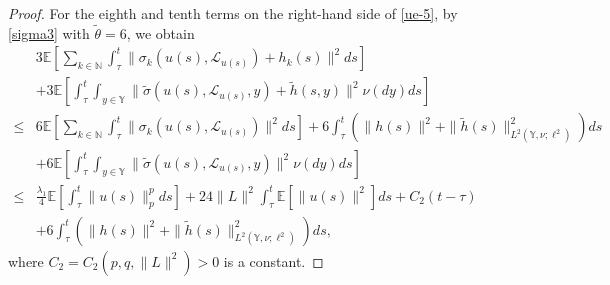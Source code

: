 \documentclass[11pt]{article}
\numberwithin{equation}{section}
\theoremstyle{plain}
\begin{document}
\begin{proof}
 For the eighth and tenth terms on the right-hand side of \eqref{ue-5},
 by \eqref{sigma3} with $\tilde{\theta}=6$, we obtain
 \begin{align}\label{ue-6}
       & 3 \mathbb{E}
                   \left[ \sum_{k \in \mathbb{N} } \int_{\tau}^{t}
                             \| \sigma_k(u(s), \mathcal{L}_{u(s)}) + h_k(s)\|^2 ds
                   \right]  \nonumber \\
       & + 3 \mathbb{E}
                 \left[  
                           \int_{\tau}^{t} \int_{
                           y\in \mathbb{Y}
                           }
                                 \|\widetilde{\sigma}(u(s), \mathcal{L}_{u(s)},y) + \widetilde{h}(s,y)\|^2
                           \nu(dy) ds
                 \right]  \nonumber \\
 \le & 6 \mathbb{E}
               \left[ \sum_{k \in \mathbb{N} } \int_{\tau}^{t} \|\sigma_k(u(s), \mathcal{L}_{u(s)}) \|^2  ds
               \right]
          + 6 \int_{\tau}^{t}
                   \left( \|h(s)\|^2 + \|\widetilde{h}(s)\|^2_{L^2(\mathbb{Y}, \nu; \ell^2)}          
                    \right) ds  \nonumber \\
      & + 6 \mathbb{E}
                 \left[ 
                           \int_{\tau}^{t} \int_{
                           y\in \mathbb{Y}}
                                 \|\widetilde{\sigma}(u(s), \mathcal{L}_{u(s)},y) \|^2
                           \nu(dy) ds
                 \right]  \nonumber \\ 
 \le & \frac{\lambda_1}{4}
             \mathbb{E}
                \left[ \int_\tau^t \| u(s) \|^p_p ds \right]
          + 24 \|L\|^2 \int_\tau^t \mathbb{E} \left[ \|u(s)\|^2 \right] ds
          +  C_2  (t-\tau)  \nonumber \\
      & + 6 \int_{\tau}^{t}
                    \left( \|h(s)\|^2 
                             + \|\widetilde{h}(s)\|^2_{L^2(\mathbb{Y}, \nu; \ell^2)}   
                    \right)ds,
 \end{align}
 where $C_2 = C_2(p, q, \|L\|^2) > 0$ is a constant.


\end{proof}
\end{document}
